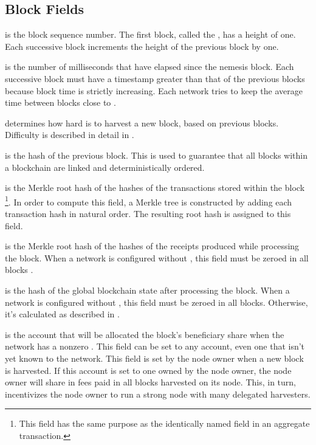 \subsection{Block Fields}

 is the block sequence number.
The first block, called the , has a height of one.
Each successive block increments the height of the previous block by one.

 is the number of milliseconds that have elapsed since the nemesis block.
Each successive block must have a timestamp greater than that of the previous blocks because block time is strictly increasing.
Each network tries to keep the average time between blocks close to .

 determines how hard is to harvest a new block, based on previous blocks.
Difficulty is described in detail in .

 is the hash of the previous block.
This is used to guarantee that all blocks within a blockchain are linked and deterministically ordered.

 is the Merkle root hash of the hashes of the transactions stored within the block
\footnote{This field has the same purpose as the identically named field in an aggregate transaction.}.
In order to compute this field, a Merkle tree is constructed by adding each transaction hash in natural order.
The resulting root hash is assigned to this field.

 is the Merkle root hash of the hashes of the receipts produced while processing the block.
When a network is configured without , this field must be zeroed in all blocks .

 is the hash of the global blockchain state after processing the block.
When a network is configured without , this field must be zeroed in all blocks.
Otherwise, it's calculated as described in .

 is the account that will be allocated the block's beneficiary share when the network has a nonzero .
This field can be set to any account, even one that isn't yet known to the network.
This field is set by the node owner when a new block is harvested.
If this account is set to one owned by the node owner, the node owner will share in fees paid in all blocks harvested on its node.
This, in turn, incentivizes the node owner to run a strong node with many delegated harvesters.

